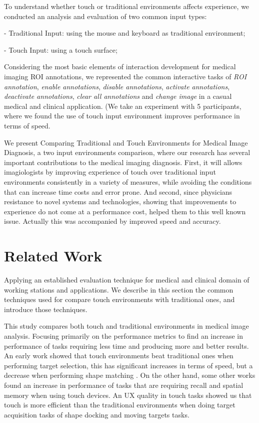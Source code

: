\documentclass{sigchi}
\begin{document}
To understand whether touch or traditional environments affects experience, we conducted an analysis and evaluation of two common input types:

- Traditional Input: using the mouse and keyboard as traditional environment;

- Touch Input: using a touch surface;

Considering the most basic elements of interaction development for medical imaging ROI annotations, we represented the common interactive tasks of \textit{ROI annotation}, \textit{enable annotations}, \textit{disable annotations}, \textit{activate annotations}, \textit{deactivate annotations}, \textit{clear all annotations} and \textit{change image} in a casual medical and clinical application. (We take an experiment with 5 participants, where we found the use of touch input environment improves performance in terms of speed.

We present Comparing Traditional and Touch Environments for Medical Image Diagnosis, a two input environments comparison, where our research has several important contributions to the medical imaging diagnosis. First, it will allows imagiologists by improving experience of touch over traditional input environments consistently in a variety of measures, while avoiding the conditions that can increase time costs and error prone. And second, since physicians resistance to novel systems and technologies, showing that improvements to experience do not come at a performance cost, helped them to this well known issue. Actually this was accompanied by improved speed and accuracy.

\section{Related Work}

Applying an established evaluation technique for medical and clinical domain of working stations and applications. We describe in this section the common techniques used for compare touch environments with traditional ones, and introduce those techniques.

This study compares both touch and traditional environments in medical image analysis. Focusing primarily on the performance metrics to find an increase in performance of tasks requiring less time and producing more and better results. An early work \cite{shanis2003comparison} showed that touch environments beat traditional ones when performing target selection, this has significant increases in terms of speed, but a decrease when performing shape matching \cite{forlines2007direct}. On the other hand, some other works \cite{tan2002kinesthetic, wallace1972spatial} found an increase in performance of tasks that are requiring recall and spatial memory when using touch devices. An UX quality in touch tasks showed us that touch is more efficient than the traditional environments when doing target acquisition tasks of shape docking and moving targets tasks.
\end{document}

